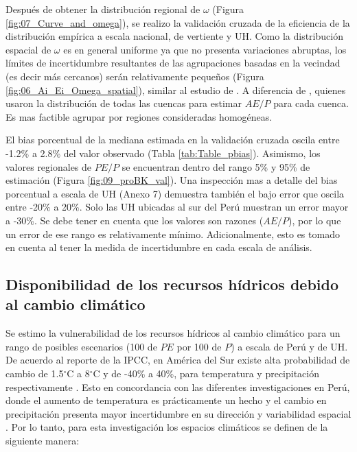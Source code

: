 \documentclass[12pt]{article}
\begin{document}
Después de obtener la distribución regional de $\omega$ (Figura \ref{fig:07_Curve_and_omega}), se realizo la validación cruzada de la eficiencia de la distribución empírica a escala nacional, de vertiente y UH. Como la distribución espacial de $\omega$ es en general uniforme ya que no presenta variaciones abruptas, los límites de incertidumbre resultantes de las agrupaciones basadas en la vecindad (es decir más cercanos) serán relativamente pequeños (Figura \ref{fig:06_Ai_Ei_Omega_spatial}), similar al estudio de \citet{Singh2015}. A diferencia de \citet{Greve2015}, quienes usaron la distribución de todas las cuencas para estimar $AE/P$ para cada cuenca. Es mas factible agrupar por regiones consideradas homogéneas.



El bias porcentual de la mediana estimada en la validación cruzada oscila entre -1.2\% a 2.8\% del valor observado (Tabla \ref{tab:Table_pbias}). Asimismo, los valores regionales de $PE/P$ se encuentran dentro del rango 5\% y 95\% de estimación (Figura \ref{fig:09_proBK_val}). Una inspección mas a detalle del bias porcentual a escala de UH (Anexo 7) demuestra también el bajo error que oscila entre -20\% a 20\%. Solo las UH ubicadas al sur del Perú muestran un error mayor a -30\%. Se debe tener en cuenta que los valores son razones ($AE/P$), por lo que un error de ese rango es relativamente mínimo. Adicionalmente, esto es tomado en cuenta al tener la medida de incertidumbre en cada escala de análisis.



\subsection{Disponibilidad de los recursos hídricos debido al cambio climático}

Se estimo la vulnerabilidad de los recursos hídricos al cambio climático para un rango de posibles escenarios (100 de $PE$ por 100 de $P$) a escala de Perú y de UH. De acuerdo al reporte de la IPCC, en América del Sur existe alta probabilidad de cambio de 1.5$^{\circ}$C a 8$^{\circ}$C y de -40\% a 40\%, para temperatura y precipitación respectivamente
\citep{stocker2013climate}. Esto en concordancia con las diferentes investigaciones en Perú, donde el aumento de temperatura es prácticamente un hecho \citep{vuille2015impact,rosas2016towards,lopez2016recent,vicente2018recent,hunziker2018effects} y el cambio en precipitación presenta mayor incertidumbre en su dirección y variabilidad espacial \citep{zubieta2017spatial,de2017can,Aybar2019}. Por lo tanto, para esta investigación los espacios climáticos se definen de la siguiente manera:
\end{document}
